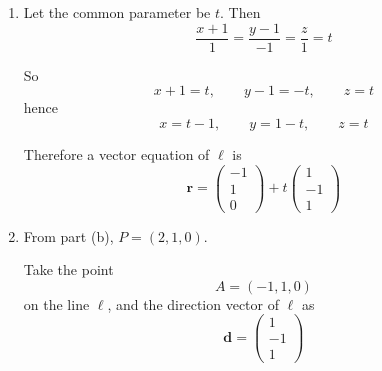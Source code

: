 \documentclass[leqno]{article}
\begin{document}
\begin{enumerate}[
  label=\textbf{\arabic*.},
  leftmargin=*,
  topsep=0pt,
  partopsep=0pt,
  parsep=0pt
]
\begin{tcolorbox}[colback=white, colframe=scarlet, title={\textbf{Solution}}, breakable, grow to left by=6mm, grow to right by=10mm]
\begin{enumerate}[label=\textbf{(\alph*)}]
Since $\det A\neq 0$, the matrix is invertible, so
\[
\mathbf{x}=A^{-1}\mathbf{b}
\]

Using a calculator to find the inverse,
\[
A^{-1}=
\begin{pmatrix}
-\frac1{15}&\frac15&\frac13\\[4pt]
\frac25&-\frac15&0\\[4pt]
\frac4{15}&\frac15&-\frac13
\end{pmatrix}
\]

Hence
\begin{align*}
\mathbf{x}
&=
\begin{pmatrix}
-\frac1{15}&\frac15&\frac13\\[4pt]
\frac25&-\frac15&0\\[4pt]
\frac4{15}&\frac15&-\frac13
\end{pmatrix}
\begin{pmatrix}
4\\
3\\
5
\end{pmatrix} 
=
\begin{pmatrix}
2\\
1\\
0
\end{pmatrix}
\end{align*}

Therefore
\[
x=2,\qquad y=1,\qquad z=0
\]

So the point of intersection is
\[
P=(2,1,0)
\]

  \item Let the common parameter be $t$. Then
\[
\frac{x+1}{1}=\frac{y-1}{-1}=\frac{z}{1}=t
\]

So
\[
x+1=t,\qquad y-1=-t,\qquad z=t
\]
hence
\[
x=t-1,\qquad y=1-t,\qquad z=t
\]

Therefore a vector equation of $\ell$ is
\[
\mathbf r=
\begin{pmatrix}
-1\\
1\\
0
\end{pmatrix}
+t
\begin{pmatrix}
1\\
-1\\
1
\end{pmatrix}
\]

  \item From part (b), $P=(2,1,0)$.

Take the point
\[
A=(-1,1,0)
\]
on the line $\ell$, and the direction vector of $\ell$ as
\[
\mathbf d=
\begin{pmatrix}
1\\
-1\\
1
\end{pmatrix}
\]


\end{enumerate}
\end{tcolorbox}
\end{enumerate}
\end{document}
